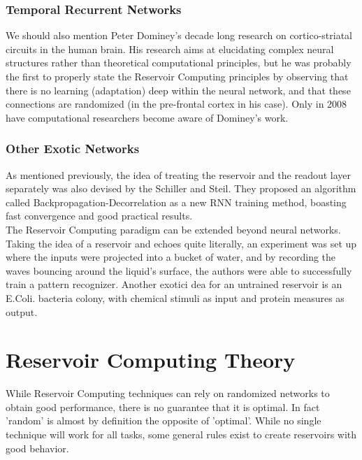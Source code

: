 \documentclass[12pt,oneside]{CUNY_CS_PhD}
\begin{document}
\subsubsection{Temporal Recurrent Networks}
We should also mention Peter Dominey's decade long research on cortico-striatal circuits in the human brain. His research aims at elucidating complex neural structures rather than theoretical computational principles, but he was probably the first to properly state the Reservoir Computing principles by observing that there is no learning (adaptation) deep within the neural network, and that these connections are randomized (in the pre-frontal cortex in his case). Only in 2008 have computational researchers become aware of Dominey's work.

\subsubsection{Other Exotic Networks}
As mentioned previously, the idea of treating the reservoir and the readout layer separately was also devised by the Schiller and Steil. They proposed an algorithm called Backpropagation-Decorrelation as a new RNN training method, boasting fast convergence and good practical results. \\
The Reservoir Computing paradigm can be extended beyond neural networks. Taking the idea of a reservoir and echoes quite literally, an experiment was set up where the inputs were projected into a bucket of water, and by recording the waves bouncing around the liquid's surface, the authors were able to successfully train a pattern recognizer. Another exotici dea for an untrained reservoir is an E.Coli. bacteria colony, with chemical stimuli as input and protein measures as output.

\section{Reservoir Computing Theory}
While Reservoir Computing techniques can rely on randomized networks to obtain good performance, there is no guarantee that it is optimal. In fact 'random' is almost by definition the opposite of 'optimal'. While no single technique will work for all tasks, some general rules exist to create reservoirs with good behavior.
\end{document}
